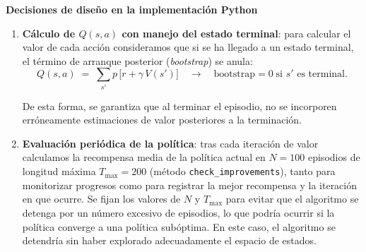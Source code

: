\textbf{Decisiones de diseño en la implementación Python}
\begin{enumerate}
  \item \textbf{Cálculo de $Q(s,a)$ con manejo del estado terminal}: para calcular el valor de cada acción consideramos que si se ha llegado a un estado terminal, el término de arranque posterior (\emph{bootstrap}) se anula:
  \[
    Q(s,a) \;=\; \sum_{s'} p\,\bigl[r + \gamma\,V(s')\bigr]
    \quad\longrightarrow\quad
    \text{bootstrap}=0\;\text{si }s'\text{ es terminal.}
  \]

  De esta forma, se garantiza que al terminar el episodio, no se incorporen erróneamente estimaciones de valor posteriores a la terminación.

  \item \textbf{Evaluación periódica de la política}: tras cada iteración de valor calculamos la recompensa media de la política actual en $N=100$ episodios de longitud máxima $T_{\max}=200$ (método \texttt{check\_improvements}), tanto para monitorizar progresos como para registrar la mejor recompensa y la iteración en que ocurre. Se fijan los valores de $N$ y $T_{\max}$ para evitar que el algoritmo se detenga por un número excesivo de episodios, lo que podría ocurrir si la política converge a una política subóptima. En este caso, el algoritmo se detendría sin haber explorado adecuadamente el espacio de estados.
\end{enumerate}